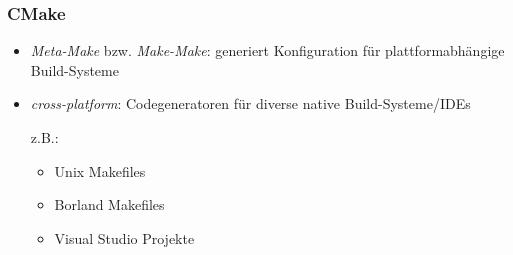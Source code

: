 \begin{frame}
	\frametitle{CMake}
	\begin{itemize}
		\pause
		\item \emph{Meta-Make} bzw. \emph{Make-Make}: generiert Konfiguration für plattformabhängige Build-Systeme
		\pause
		\item \emph{cross-platform}: Codegeneratoren für diverse native Build-Systeme/IDEs

			z.B.:
			\begin{itemize}
				\item Unix Makefiles
				\item Borland Makefiles
				\item Visual Studio Projekte
			\end{itemize}
	\end{itemize}
\end{frame}
